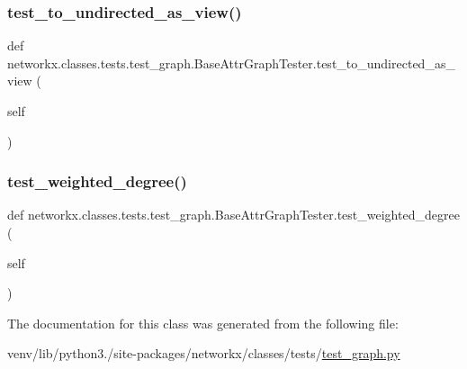 \subsubsection{\texorpdfstring{test\+\_\+to\+\_\+undirected\+\_\+as\+\_\+view()}{test\_to\_undirected\_as\_view()}}
{\footnotesize\ttfamily def networkx.\+classes.\+tests.\+test\+\_\+graph.\+Base\+Attr\+Graph\+Tester.\+test\+\_\+to\+\_\+undirected\+\_\+as\+\_\+view (\begin{DoxyParamCaption}\item[{}]{self }\end{DoxyParamCaption})}

\mbox{\label{classnetworkx_1_1classes_1_1tests_1_1test__graph_1_1BaseAttrGraphTester_aee7898afb174bb542b0e23f3a5d37a91}} 
\subsubsection{\texorpdfstring{test\+\_\+weighted\+\_\+degree()}{test\_weighted\_degree()}}
{\footnotesize\ttfamily def networkx.\+classes.\+tests.\+test\+\_\+graph.\+Base\+Attr\+Graph\+Tester.\+test\+\_\+weighted\+\_\+degree (\begin{DoxyParamCaption}\item[{}]{self }\end{DoxyParamCaption})}



The documentation for this class was generated from the following file\+:\begin{DoxyCompactItemize}
\item 
venv/lib/python3./site-\/packages/networkx/classes/tests/\hyperlink{test__graph_8py}{test\+\_\+graph.\+py}\end{DoxyCompactItemize}
